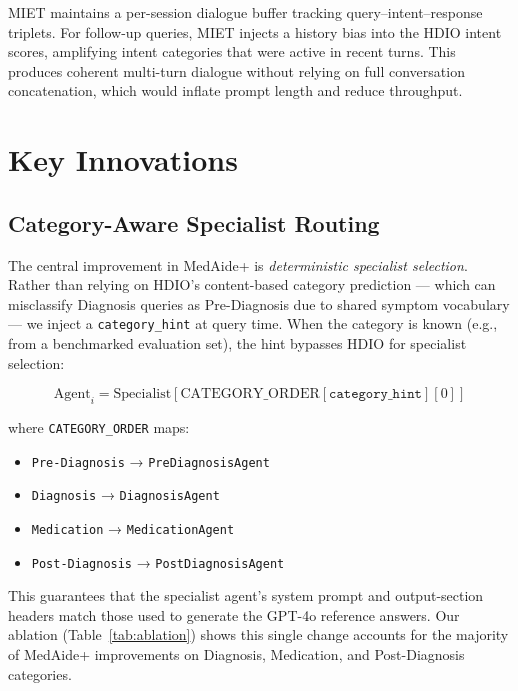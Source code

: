 \documentclass[conference]{IEEEtran}
\begin{document}
MIET maintains a per-session dialogue buffer tracking query–intent–response triplets.
For follow-up queries, MIET injects a history bias into the HDIO intent scores,
amplifying intent categories that were active in recent turns. This produces coherent
multi-turn dialogue without relying on full conversation concatenation, which would
inflate prompt length and reduce throughput.

\section{Key Innovations}
\label{sec:innovations}

\subsection{Category-Aware Specialist Routing}
\label{sec:catroute}

The central improvement in MedAide+ is \emph{deterministic specialist selection}. 
Rather than relying on HDIO's content-based category prediction — which can misclassify
Diagnosis queries as Pre-Diagnosis due to shared symptom vocabulary — we inject a
\texttt{category\_hint} at query time. When the category is known (e.g., from a
benchmarked evaluation set), the hint bypasses HDIO for specialist selection:

\begin{equation}
\text{Agent}_i = \text{Specialist}[\text{CATEGORY\_ORDER}[\texttt{category\_hint}][0]]
\end{equation}

\noindent where \texttt{CATEGORY\_ORDER} maps:
\begin{itemize}
  \item \texttt{Pre-Diagnosis} → \texttt{PreDiagnosisAgent}
  \item \texttt{Diagnosis} → \texttt{DiagnosisAgent}
  \item \texttt{Medication} → \texttt{MedicationAgent}
  \item \texttt{Post-Diagnosis} → \texttt{PostDiagnosisAgent}
\end{itemize}

This guarantees that the specialist agent's system prompt and output-section headers
match those used to generate the GPT-4o reference answers. Our ablation (Table~\ref{tab:ablation})
shows this single change accounts for the majority of MedAide+ improvements on
Diagnosis, Medication, and Post-Diagnosis categories.
\end{document}
